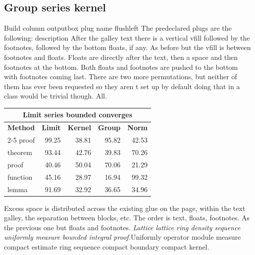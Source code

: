 \documentclass{article}
\begin{document}
\subsection{Group series kernel}
Build column outputbox plug name flushleft The predeclared plugs are the following: description After the galley text there is a vertical vfill followed by the footnotes, followed by the bottom floats, if any. As before but the vfill is between footnotes and floats. Floats are directly after the text, then a space and then footnotes at the bottom. Both floats and footnotes are pushed to the bottom with footnotes coming last. There are two more permutations, but neither of them has ever been requested so they aren t set up by default doing that in a class would be trivial though. All.
\begin{center}
\begin{tabular}{l@{}rrrr}
\hline
\multicolumn{5}{c}{\bfseries Limit series bounded converges} \\ \hline
\bfseries Method & \bfseries Limit & \bfseries Kernel & \bfseries Group & \bfseries Norm \\ \cline{2-5}
proof & 99.25 & 38.81 & 95.82 & 42.53 \\
theorem & 93.44 & 42.76 & 39.83 & 70.26 \\
proof & 40.46 & 50.04 & 70.06 & 21.29 \\
function & 45.16 & 28.97 & 16.94 & 99.32 \\
lemma & 91.69 & 32.92 & 36.65 & 34.96 \\
\hline
\end{tabular}
\end{center}
\noindent Excess space is distributed across the existing glue on the page, within the text galley, the separation between blocks, etc. The order is text, floats, footnotes. As the previous one but floats and footnotes. {\itshape Lattice lattice ring density sequence uniformly measure bounded integral proof.}\hspace{.05\textwidth}Uniformly operator module measure compact estimate ring sequence compact boundary compact kernel.
\end{document}

